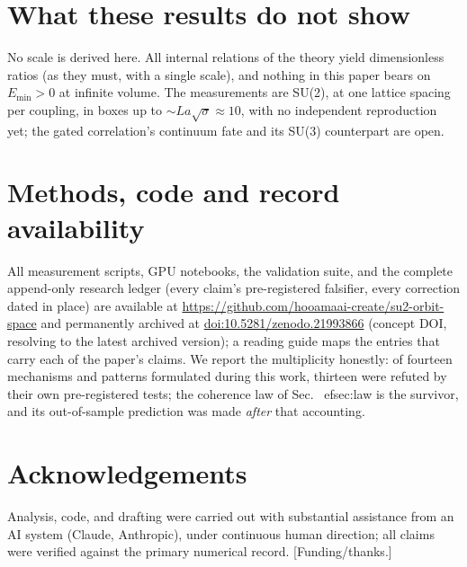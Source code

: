 \documentclass[11pt]{article}
\begin{document}
\section{What these results do not show}
No scale is derived here. All internal relations of the theory yield dimensionless
ratios (as they must, with a single scale), and nothing in this paper bears on
$E_{\min}>0$ at infinite volume. The measurements are SU(2), at one lattice spacing per
coupling, in boxes up to $\sim L a\sqrt{\sigma}\approx10$, with no independent
reproduction yet; the gated correlation's continuum fate and its SU(3) counterpart are open.

\section*{Methods, code and record availability}
All measurement scripts, GPU notebooks, the validation suite, and the complete
append-only research ledger (every claim's pre-registered falsifier, every correction
dated in place) are available at \url{https://github.com/hooamaai-create/su2-orbit-space} and permanently archived at \href{https://doi.org/10.5281/zenodo.21993866}{doi:10.5281/zenodo.21993866} (concept DOI, resolving to the latest archived version); a reading guide maps the entries that
carry each of the paper's claims. We report the multiplicity honestly: of fourteen
mechanisms and patterns formulated during this work, thirteen were refuted by their own
pre-registered tests; the coherence law of Sec.~
ef{sec:law} is the survivor, and its
out-of-sample prediction was made \emph{after} that accounting.

\section*{Acknowledgements}
Analysis, code, and drafting were carried out with substantial assistance from an AI
system (Claude, Anthropic), under continuous human direction; all claims were verified
against the primary numerical record. [Funding/thanks.]
\end{document}
